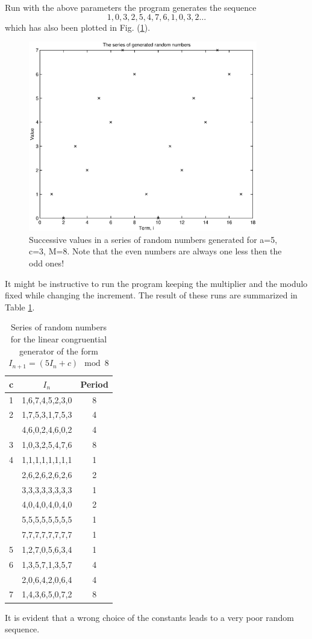 Run with the above parameters the program generates the sequence
\begin{equation*}
1, 0, 3, 2, 5, 4, 7, 6, 1, 0, 3, 2 \ldots
\end{equation*}
which has also been plotted in Fig. (\ref{F_TRANDOM1}).
\begin{figure}
\label{F_TRANDOM1}
\includegraphics[width=10cm]{./Figures/f_trandom1.eps}
\caption{Successive values in a series of random numbers generated
for a=5, c=3, M=8. Note that the even numbers are always one less 
then the odd ones!}
\end{figure}
It might be instructive to run the program keeping the multiplier 
and the modulo fixed while changing the increment. The result of 
these runs are summarized in Table \ref{T_LCG}.

\begin{table}
\label{T_LCG}
\caption{Series of random numbers for the linear congruential 
generator of the form $I_{n+1} = (5I_n +c) \mod 8$}
\begin{tabular}{ccc} \hline
c &  $I_n$ & Period  \\ \hline
1 & 1,6,7,4,5,2,3,0 & 8 \\
2 & 1,7,5,3,1,7,5,3 & 4 \\
  & 4,6,0,2,4,6,0,2 & 4 \\
3 & 1,0,3,2,5,4,7,6 & 8 \\
4 & 1,1,1,1,1,1,1,1 & 1 \\
  & 2,6,2,6,2,6,2,6 & 2 \\
  & 3,3,3,3,3,3,3,3 & 1 \\
  & 4,0,4,0,4,0,4,0 & 2 \\
  & 5,5,5,5,5,5,5,5 & 1 \\
  & 7,7,7,7,7,7,7,7 & 1 \\
5 & 1,2,7,0,5,6,3,4 & 1 \\
6 & 1,3,5,7,1,3,5,7 & 4 \\
  & 2,0,6,4,2,0,6,4 & 4 \\
7 & 1,4,3,6,5,0,7,2 & 8
\end{tabular}
\end{table}
It is evident that a wrong  choice of the constants leads to a 
very poor random sequence.

